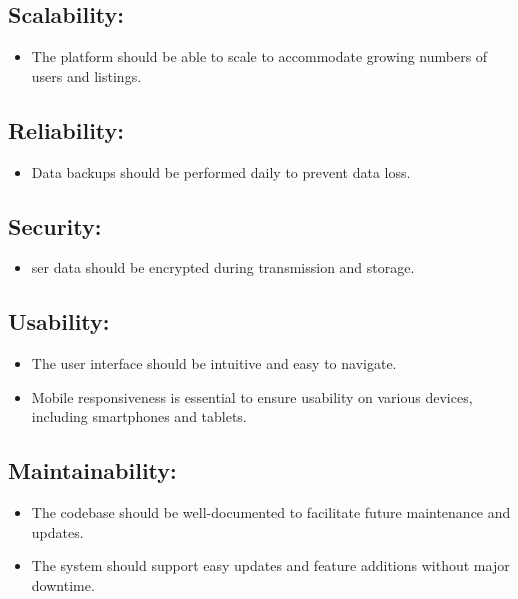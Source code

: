 \subsection{Scalability:}
\begin{itemize}
        \item The platform should be able to scale to accommodate growing numbers of users and listings.
\end{itemize}

\subsection{Reliability:}
\begin{itemize}
        \item Data backups should be performed daily to prevent data loss.
\end{itemize}

\subsection{Security:}
\begin{itemize}
        \item ser data should be encrypted during transmission and storage.
\end{itemize}

\subsection{Usability:}
\begin{itemize}
        \item The user interface should be intuitive and easy to navigate.
        \item Mobile responsiveness is essential to ensure usability on various devices, including smartphones and tablets.
\end{itemize}

\subsection{Maintainability:}
\begin{itemize}
        \item The codebase should be well-documented to facilitate future maintenance and updates.
        \item The system should support easy updates and feature additions without major downtime.
\end{itemize}


